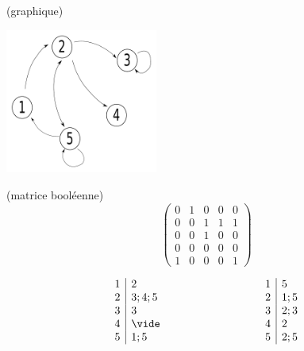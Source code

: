  (graphique)
\begin{center}\includegraphics[width=5cm]{D4_1.pdf}\end{center}
\par
{} (matrice booléenne)
$$\left( \begin{array}{ccccc} 
		0 & 1 & 0 & 0 & 0 \\
		0 & 0 & 1 & 1 & 1 \\
		0 & 0 & 1 & 0 & 0 \\
		0 & 0 & 0 & 0 & 0 \\
		1 & 0 & 0 & 0 & 1 
		\end{array} \right)$$

\par

$$\begin{array}{c|l}
	1 & 2 \\
  2 & 3 ; 4 ; 5 \\
	3 & 3 \\
	4 & \vide \\
	5 & 1 ; 5 \\
\end{array}
\hskip 3cm
\begin{array}{c|l}
	1 & 5 \\
	2 & 1 ; 5 \\
	3 & 2 ; 3 \\
	4 & 2 \\
	5 & 2 ; 5
\end{array}$$ 
